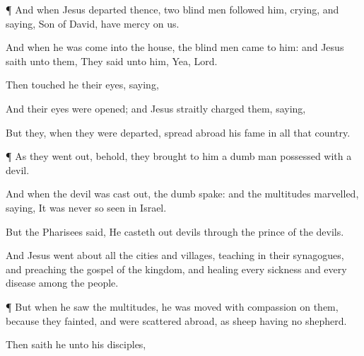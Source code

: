 {\par }{\PP {}¶
And
when
Jesus
departed
thence,
two blind
men
followed
him,
crying,
and
saying,
{}
Son of
David, have mercy
on
us.

And when he was
come
into the
house, the blind
men
came to
him:
and
Jesus
saith unto
them,
{} They
said unto
him,
Yea,
Lord.

Then touched
he
their
eyes,
saying,
{}

And
their
eyes were
opened;
and
Jesus straitly
charged
them,
saying,
{}

But
they, when they were
departed, spread
abroad
his
fame
in
all
that
country.


\par }{\PP {}¶
As
they went
out,
behold, they
brought to
him a
dumb
man possessed with a
devil.

And
when the
devil was cast
out, the
dumb
spake:
and the
multitudes
marvelled,
saying, It
was
never
so
seen
in
Israel.

But the
Pharisees
said, He casteth
out
devils
through the
prince of the
devils.

And
Jesus went
about
all the
cities
and
villages,
teaching
in
their
synagogues,
and
preaching the
gospel of the
kingdom,
and
healing
every
sickness
and
every
disease
among the
people.


\par }{\PP {}¶
But when he
saw the
multitudes, he was moved with
compassion
on
them,
because
they
fainted,
and
were scattered
abroad,
as
sheep
having
no
shepherd.

Then saith
he
unto
his
disciples,
{}





\par }
